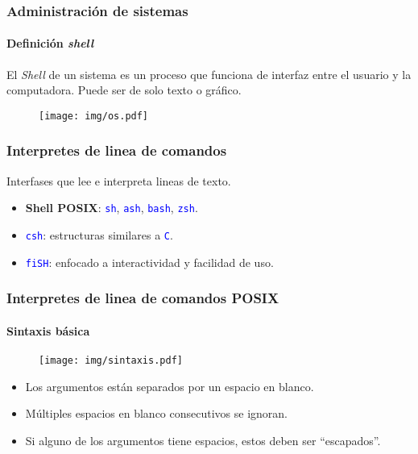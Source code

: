 \documentclass[11pt,a4paper,spanish]{beamer}
\newcommand{\cw}[1]{\mbox{\texttt{\textcolor{blue}{#1}}}}
\begin{document}
\begin{frame}

    \frametitle{Administración de sistemas}
    \framesubtitle{Definición \emph{shell}}

    El \emph{Shell} de un sistema es un proceso que funciona de interfaz
    entre el usuario y la computadora. Puede ser de solo texto o gráfico.

    \begin{figure}
    \centering
    \texttt{[image: img/os.pdf]}
        \captionsetup{textfont=tiny,labelformat=empty,justification=centering}
        \caption{}
    \end{figure}

\end{frame}

\begin{frame}

    \frametitle{Interpretes de linea de comandos}

    Interfases que lee e interpreta lineas de texto.

    \begin{itemize}
        \item \textbf{Shell POSIX}: \cw{sh}, \cw{ash},
            \cw{bash}, \cw{zsh}.
        \item \cw{csh}: estructuras similares a \cw{C}.
        \item \cw{fiSH}: enfocado a interactividad y facilidad de uso.
    \end{itemize}

\end{frame}

\begin{frame}

    \frametitle{Interpretes de linea de comandos POSIX}
    \framesubtitle{Sintaxis básica}

    \begin{figure}
    \centering
    \texttt{[image: img/sintaxis.pdf]}
    \end{figure}

    \begin{itemize}
        \item Los argumentos están separados por un espacio en blanco.
        \item Múltiples espacios en blanco consecutivos se ignoran.
        \item Si alguno de los argumentos tiene espacios, estos deben ser
            ``escapados''.
    \end{itemize}

\end{frame}
\end{document}
